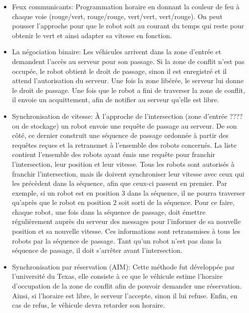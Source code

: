 \documentclass[french,a4paper,12pt]{report}
\begin{document}
\begin{itemize}
\item Feux communicants:
Programmation horaire en donnant la couleur de feu à chaque voie (rouge/vert, rouge/rouge, vert/vert, vert/rouge).
On peut pousser l'approche pour que le robot soit au courant du temps qui reste pour obtenir le vert et ainsi adapter sa vitesse en fonction.

\item La négociation binaire:
Les véhicules arrivent dans la zone d'entrée et demandent l'accès au serveur pour son passage.
Si la zone de conflit n'est pas occupée, le robot obtient le droit de passage, sinon il est enregistré et il attend l'autorisation du serveur. Une fois la zone libérée, le serveur lui donne le droit de passage.
Une fois que le robot a fini de traverser la zone de conflit, il envoie un acquittement, afin de notifier au serveur qu'elle est libre.

\item Synchronisation de vitesse:
À l’approche de l'intersection (zone d’entrée ???? ou de stockage) un robot envoie une requête de passage au serveur.
De son côté, ce dernier construit une séquence de passage ordonnée à partir des requêtes reçues et la retransmet
à l’ensemble des robots concernés. La liste contient l’ensemble des robots ayant émis une requête pour franchir
l’intersection, leur position et leur vitesse. Tous les robots sont autorisés à franchir l’intersection, mais ils doivent synchroniser leur vitesse avec ceux qui les précèdent dans la séquence, afin que ceux-ci passent en premier. Par exemple, si un robot est en position 3 dans la séquence, il ne pourra traverser qu’après que le robot en position 2 soit sorti de la séquence. Pour ce faire, chaque robot, une fois dans la séquence de passage, doit émettre régulièrement auprès du serveur des messages pour l’informer de sa nouvelle position et sa nouvelle vitesse. Ces informations sont retransmises à
tous les robots par la séquence de passage. Tant qu’un robot n’est pas dans la séquence de passage, il doit s’arrêter avant l’intersection.

\item Synchronisation par réservation (AIM):
Cette méthode fut développée par l'université du Texas, elle consiste à ce que le véhicule estime l'horaire d'occupation de la zone de conflit afin de pouvoir demander une réservation.
Ainsi, si l'horaire est libre, le serveur l'accepte, sinon il lui refuse.
Enfin, en cas de refus, le véhicule devra retarder son horaire.
\end{itemize}
\end{document}
